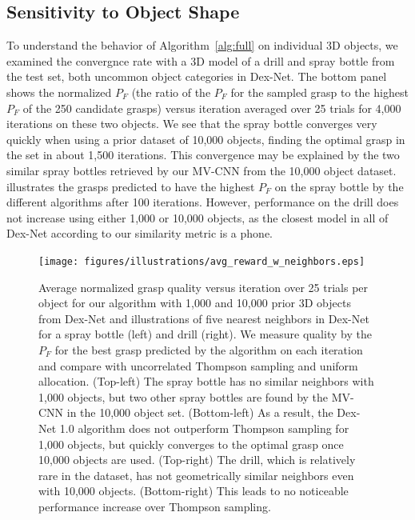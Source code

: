 \subsection{Sensitivity to Object Shape}
To understand the behavior of Algorithm~\ref{alg:full} on individual 3D objects, we examined the convergnce rate with a 3D model of a drill and spray bottle from the test set, both uncommon object categories in Dex-Net.
The bottom panel~ shows the normalized $P_F$ (the ratio of the $P_F$ for the sampled grasp to the highest $P_F$ of the 250 candidate grasps) versus iteration averaged over 25 trials for 4,000 iterations on these two objects.
We see that the spray bottle converges very quickly when using a prior dataset of 10,000 objects, finding the optimal grasp in the set in about 1,500 iterations.
This convergence may be explained by the two similar spray bottles retrieved by our MV-CNN from the 10,000 object dataset.
 illustrates the grasps predicted to have the highest $P_F$ on the spray bottle by the different algorithms after 100 iterations.
However, performance on the drill does not increase using either 1,000 or 10,000 objects, as the closest model in all of Dex-Net according to our similarity metric is a phone.


\begin{figure}[t!]
\centering
\texttt{[image: figures/illustrations/avg\_reward\_w\_neighbors.eps]}
\caption{Average normalized grasp quality versus iteration over 25 trials per object for our algorithm with 1,000 and 10,000 prior 3D objects from Dex-Net and illustrations of five nearest neighbors in Dex-Net for a spray bottle (left) and drill (right). We measure quality by the $P_F$ for the best grasp predicted by the algorithm on each iteration and compare with uncorrelated Thompson sampling and uniform allocation. (Top-left) The spray bottle has no similar neighbors with 1,000 objects, but two other spray bottles are found by the MV-CNN in the 10,000 object set. (Bottom-left) As a result, the Dex-Net 1.0 algorithm does not outperform Thompson sampling for 1,000 objects, but quickly converges to the optimal grasp once 10,000 objects are used. (Top-right) The drill, which is relatively rare in the dataset, has not geometrically similar neighbors even with 10,000 objects. (Bottom-right) This leads to no noticeable performance increase over Thompson sampling.}
\vspace*{-15pt}
\end{figure}

